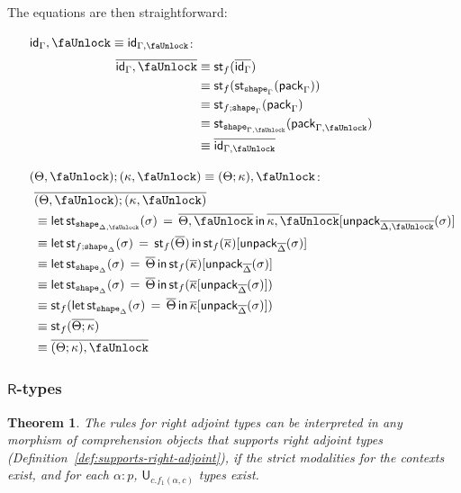 \documentclass[10pt]{article}
\newtheorem{theorem}{Theorem}
\theoremstyle{definition}
\newcommand{\id}{\mathsf{id}}
\newcommand\StI[2]{\ensuremath{\mathsf{st}_{#1}(#2)}}
\newcommand\StE[4]{\ensuremath{\mathsf{let} \, \StI{#1}{#3} \, = \, {#2} \, \mathsf{in} \, #4}}
\newcommand\pack[1]{\ensuremath{\mathsf{pack}_{#1}}}
\newcommand\unpack[2]{\ensuremath{\mathsf{unpack}_{#1}(#2)}}
\newcommand{\tshape}[1]{\ensuremath{\mathtt{shape}_{#1}}}
\newcommand{\upstairs}[1]{\overline{#1}}
\newcommand{\lock}{\text{\faUnlock}}
\begin{document}
The equations are then straightforward:
\begin{enumerate}[style = multiline, labelwidth = 80pt]
\item[{$\id_\Gamma , \lock \equiv \id_{\Gamma, \lock}$}:]
\begin{align*}
\upstairs{\id_\Gamma , \lock}
&\equiv \StI{f}{\upstairs{\id_\Gamma}} \\
&\equiv \StI{f}{\StI{\tshape{\Gamma}}{\pack{\Gamma}}} \\
&\equiv \StI{f;\tshape{\Gamma}}{\pack{\Gamma}} \\
&\equiv \StI{\tshape{\Gamma, \lock}}{\pack{\Gamma, \lock}} \\
&\equiv \upstairs{\id_{\Gamma, \lock}}
\end{align*}

\item[{$(\Theta, \lock) ; (\kappa, \lock) \equiv (\Theta ; \kappa), \lock$}:] 
\begin{align*}
&\upstairs{(\Theta, \lock) ; (\kappa, \lock)} \\
&\equiv \StE{\tshape{\Delta, \lock}}{\upstairs{\Theta, \lock}}{\sigma}{\upstairs{\kappa, \lock}[\unpack{\upstairs{\Delta, \lock}}{\sigma}]} \\
&\equiv \StE{f;\tshape{\Delta}}{\StI{f}{\upstairs{\Theta}}}{\sigma}{\StI{f}{\upstairs{\kappa}}[\unpack{\upstairs{\Delta}}{\sigma}]} \\
&\equiv \StE{\tshape{\Delta}}{\upstairs{\Theta}}{\sigma}{\StI{f}{\upstairs{\kappa}}[\unpack{\upstairs{\Delta}}{\sigma}]} \\
&\equiv \StE{\tshape{\Delta}}{\upstairs{\Theta}}{\sigma}{\StI{f}{\upstairs{\kappa}[\unpack{\upstairs{\Delta}}{\sigma}]}} \\
&\equiv \StI{f}{\StE{\tshape{\Delta}}{\upstairs{\Theta}}{\sigma}{\upstairs{\kappa}[\unpack{\upstairs{\Delta}}{\sigma}]}} \\
&\equiv \StI{f}{\upstairs{\Theta ; \kappa}} \\
&\equiv \upstairs{(\Theta ; \kappa), \lock}
\end{align*}
\end{enumerate}

\subsubsection{$\mathsf{R}$-types}

\begin{theorem}
  The rules for right adjoint types can be interpreted in any morphism
  of comprehension objects that supports right adjoint types
  (Definition~\ref{def:supports-right-adjoint}), if the strict modalities for
  the contexts exist, and for each $\alpha : p$,
  $\mathsf{U}_{c.f_1(\alpha,c)}$ types exist.
\end{theorem}
\end{document}
